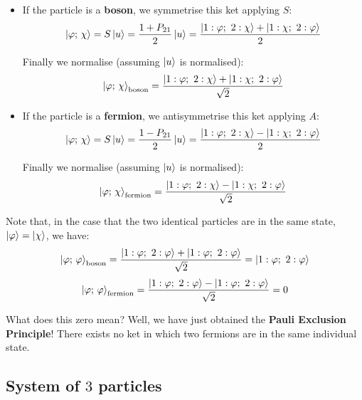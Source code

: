 \begin{itemize}
    \item If the particle is a \textbf{boson}, we symmetrise this ket applying $S$:
    \begin{equation}
        \ket{\varphi;\, \chi} = S\ket{u} = \frac{1 + P_{21}}{2}\ket{u} = \frac{\ket{1:\varphi;\ 2:\chi} + \ket{1:\chi;\ 2:\varphi}}{2}
    \end{equation}

    Finally we normalise (assuming $\ket{u}$ is normalised):
    \begin{equation}
        \ket{\varphi;\, \chi}_\text{boson} = \frac{\ket{1:\varphi;\ 2:\chi} + \ket{1:\chi;\ 2:\varphi}}{\sqrt{2}}
    \end{equation}
    \item If the particle is a \textbf{fermion}, we antisymmetrise this ket applying $A$:
    \begin{equation}
        \ket{\varphi;\, \chi} = S\ket{u} = \frac{1 - P_{21}}{2}\ket{u} = \frac{\ket{1:\varphi;\ 2:\chi} - \ket{1:\chi;\ 2:\varphi}}{2}
    \end{equation}

    Finally we normalise (assuming $\ket{u}$ is normalised):
    \begin{equation}
        \ket{\varphi;\, \chi}_\text{fermion} = \frac{\ket{1:\varphi;\ 2:\chi} - \ket{1:\chi;\ 2:\varphi}}{\sqrt{2}}
    \end{equation}
\end{itemize}

Note that, in the case that the two identical particles are in the same state, $\ket{\varphi} = \ket{\chi}$, we have:
\begin{equation}
    \ket{\varphi;\, \varphi}_\text{boson} = \frac{\ket{1:\varphi;\ 2:\varphi} + \ket{1:\varphi;\ 2:\varphi}}{\sqrt{2}} = \ket{1:\varphi;\ 2:\varphi}
\end{equation}
\begin{equation}
    \ket{\varphi;\, \varphi}_\text{fermion} = \frac{\ket{1:\varphi;\ 2:\varphi} - \ket{1:\varphi;\ 2:\varphi}}{\sqrt{2}} = 0
\end{equation}

What does this zero mean? Well, we have just obtained the \textbf{Pauli Exclusion Principle}! There exists no ket in which two fermions are in the same individual state. 

\subsection{System of $3$ particles}

